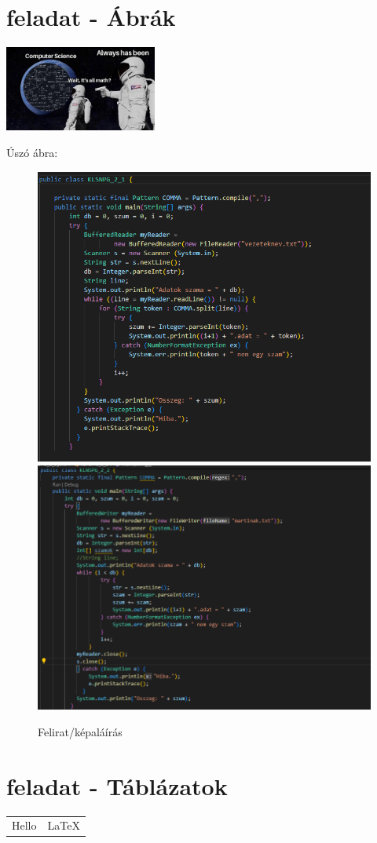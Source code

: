 \documentclass{article}
\begin{document}
\section{feladat - Ábrák}

\includegraphics[width=5cm]{263531453_681134376205686_6229760029118006700_n.png}
\bigskip

\noindent \Large{Úszó ábra:}\\
\begin{figure}[bt]
	\centering
	\caption{Felirat/képaláírás}
	\label{fig:kepek}
	\includegraphics[width=.4\linewidth]{1.png}
	\hspace{1em} %
	\includegraphics[width=.4\linewidth]{2.png}
\end{figure}

\clearpage
\section{feladat - Táblázatok}
\begin{tabular}{|p{3cm} | p{5cm} |}
	\hline
	Hello& \LaTeX
\end{tabular}
\end{document}
